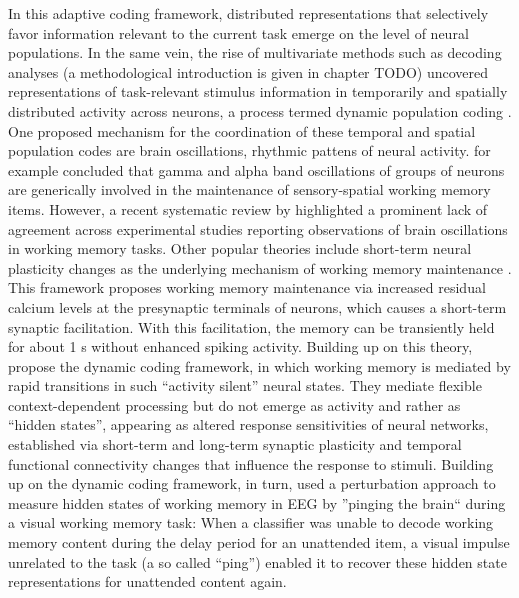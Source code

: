 In this adaptive coding framework, distributed representations that selectively favor information relevant to the current task emerge on the level of neural populations.
In the same vein, the rise of multivariate methods such as decoding analyses (a methodological introduction is given in chapter TODO) uncovered representations of task-relevant stimulus information in temporarily and spatially distributed activity across neurons, a process termed dynamic population coding \citep{sreenivasan2014revisiting}.
One proposed mechanism for the coordination of these temporal and spatial population codes are brain oscillations, rhythmic pattens of neural activity.
\citet{roux2014working} for example concluded that gamma and alpha band oscillations of groups of neurons are generically involved in the maintenance of sensory-spatial working memory items.
However, a recent systematic review by \citet{pavlov2022oscillatory} highlighted a prominent lack of agreement across experimental studies reporting observations of brain oscillations in working memory tasks.
Other popular theories include short-term neural plasticity changes as the underlying mechanism of working memory maintenance \citep{mongillo2008synaptic}.
This framework proposes working memory maintenance via increased residual calcium levels at the presynaptic terminals of neurons, which causes a short-term synaptic facilitation.
With this facilitation, the memory can be transiently held for about 1 s without enhanced spiking activity.
Building up on this theory,  \citet{stokes2013dynamic, stokes2015activity} propose the dynamic coding framework, in which working memory is mediated by rapid transitions in such ``activity silent'' neural states.
They mediate flexible context-dependent processing but do not emerge as activity and rather as ``hidden states'', appearing as altered response sensitivities of neural networks, established via short-term and long-term synaptic plasticity and temporal functional connectivity changes that influence the response to stimuli.
Building up on the dynamic coding framework, in turn, \citet{wolff2017dynamic} used a perturbation approach to measure hidden states of working memory in EEG by ''pinging the brain`` during a visual working memory task:
When a classifier was unable to decode working memory content during the delay period for an unattended item, a visual impulse unrelated to the task (a so called ``ping'') enabled it to recover these hidden state representations for unattended content again.



